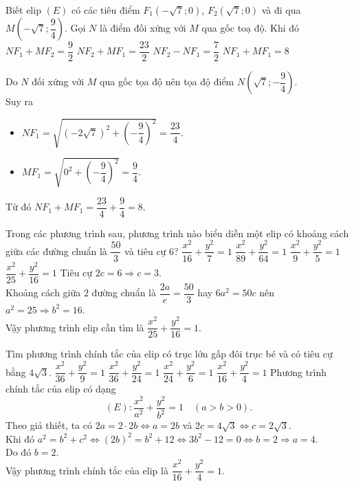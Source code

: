\begin{ex}%
	Biết elip $(E)$ có các tiêu điểm $F_1\left( -\sqrt{7};0 \right)$, $F_2\left( \sqrt{7};0 \right)$ và đi qua $M\left( -\sqrt{7}; \dfrac{9}{4} \right)$. Gọi $N$ là điểm đối xứng với $M$ qua gốc toạ độ. Khi đó
	\choice
	{$NF_1 + MF_2 = \dfrac{9}{2}$}
	{$NF_2 + MF_1 = \dfrac{23}{2}$}
	{$NF_2 - NF_1 = \dfrac{7}{2}$}
	{\True $NF_1 + MF_1 = 8$}
	\loigiai
	{
		Do $N$ đối xứng với $M$ qua gốc tọa độ nên tọa độ điểm $N\left( \sqrt{7}; -\dfrac{9}{4} \right)$.\\
		Suy ra
		\begin{itemize}
			\item $NF_1 = \sqrt{\left( -2\sqrt{7} \right)^2 + \left( - \dfrac{9}{4} \right)^2} = \dfrac{23}{4} $.
			\item $MF_1 = \sqrt{0^2 + \left( - \dfrac{9}{4} \right)^2} = \dfrac{9}{4} $.
		\end{itemize}
		Từ đó $NF_1 + MF_1 = \dfrac{23}{4} + \dfrac{9}{4} = 8$.
		
	}
\end{ex}

\begin{ex}%
	Trong các phương trình sau, phương trình nào biểu diễn một elip có khoảng cách giữa các đường chuẩn là $\dfrac{50}{3}$ và tiêu cự $6$?
	\choice
	{$\dfrac{x^2}{16} + \dfrac{y^2}{7} = 1$}
	{$\dfrac{x^2}{89} + \dfrac{y^2}{64} = 1$}
	{$\dfrac{x^2}{9} + \dfrac{y^2}{5} = 1$}
	{\True $\dfrac{x^2}{25} + \dfrac{y^2}{16} = 1$}
	\loigiai
	{
		Tiêu cự $2c = 6 \Rightarrow c = 3$.\\
		Khoảng cách giữa $2$ đường chuẩn là $\dfrac{2a}{e} = \dfrac{50}{3}$ hay $6a^2 = 50c$ nên $a^2 = 25 \Rightarrow b^2 = 16$.\\
		Vậy phương trình elip cần tìm là $ \dfrac{x^2}{25} + \dfrac{y^2}{16} = 1$.
	}
\end{ex}

\begin{ex}%
	Tìm phương trình chính tắc của elip có trục lớn gấp đôi trục bé và có tiêu cự bằng $4\sqrt{3}$.
	\choice
	{$\dfrac{x^2}{36} + \dfrac{y^2}{9} = 1$}
	{$\dfrac{x^2}{36} + \dfrac{y^2}{24} = 1$}
	{$\dfrac{x^2}{24} + \dfrac{y^2}{6} = 1$}
	{\True $\dfrac{x^2}{16} + \dfrac{y^2}{4} = 1$}
	\loigiai
	{
		Phương trình chính tắc của elip có dạng 
		$$ (E)\colon \dfrac{x^2}{a^2} + \dfrac{y^2}{b^2} = 1 \quad (a > b >0). $$
		Theo giả thiết, ta có $2a = 2\cdot 2b \Leftrightarrow a = 2b$ và $2c = 4\sqrt{3} \Leftrightarrow c = 2\sqrt{3}$.\\
		Khi đó $a^2 = b^2 + c^2 \Leftrightarrow (2b)^2 = b^2 + 12 \Leftrightarrow 3b^2 - 12 = 0 \Leftrightarrow b = 2 \Rightarrow a = 4$.\\
		Do đó $b = 2$.\\
		Vậy phương trình chính tắc của elip là $ \dfrac{x^2}{16} + \dfrac{y^2}{4} = 1$.
	}
\end{ex}

